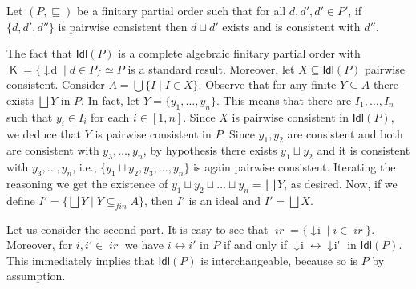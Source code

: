 \documentclass[conference]{IEEEtran}
\renewenvironment{proof}{\begin{IEEEproof}}{\end{IEEEproof}}
\newcommand{\wi}{{interchangeable}}
\newcommand{\compact}[1]{\ensuremath{\mathop{\mathsf{K}({#1})}}}
\newcommand{\principal}[1]{\ensuremath{\mathop{\downarrow\!{#1}}}}
\newcommand{\ideal}[1]{\ensuremath{\mathsf{Idl}({#1})}}
\newcommand{\ir}[1]{\ensuremath{\mathop{\mathit{ir}({#1})}}}
\newcommand{\interval}[2][1]{\ensuremath{[{#1},{#2}]}}
\begin{document}
\begin{proof}
  Let $(P,\sqsubseteq)$ be a 
  finitary partial order such that for all $d, d', d' \in P'$,
  if $\{ d, d', d''\}$ is pairwise consistent then
  $d \sqcup d'$ exists and is consistent with $d''$.

  The fact that $\ideal{P}$ is a
  complete algebraic finitary
  partial order with
  $\compact{\ideal{P}} = \{ \principal{d} \mid d \in P \} \simeq P$ is
  a standard result. 
  Moreover, let $X \subseteq \ideal{P}$ pairwise consistent. Consider
  $A = \bigcup \{ I \mid I \in X\}$. Observe that for any finite
  $Y \subseteq A$ there exists $\bigsqcup Y$ in $P$. In fact, let
  $Y = \{ y_1, \ldots, y_n \}$. This means that there are
  $I_1, \ldots, I_n$ such that $y_i \in I_i$ for each
  $i \in \interval{n}$. Since $X$ is pairwise consistent in
  $\ideal{P}$, we deduce that $Y$ is pairwise consistent in $P$.
  Since $y_1, y_2$ are consistent and both are consistent with
  $y_3, \ldots, y_n$, by {hypothesis} there exists $y_1 \sqcup y_2$ and it is
  consistent with $y_3, \ldots, y_n$, i.e.,
  $\{ y_1 \sqcup y_2, y_3, \ldots, y_n \}$ is again pairwise
  consistent. Iterating the reasoning we get the existence of
  $y_1 \sqcup y_2 \sqcup \ldots \sqcup y_n = \bigsqcup Y$, as desired.
  Now, if we define
  $I' = \{ \bigsqcup Y \mid Y \subseteq_{\mathit{fin}} A \}$, then
  $I'$ is an ideal and $I' = \bigsqcup X$.

  \bigskip

  
  Let us consider the second part. It is easy to see that
  $\ir{\ideal{P}} = \{ \principal{i} \mid i \in \ir{P} \}$.
  Moreover, for $i, i' \in \ir{P}$ we have $i \leftrightarrow i'$
  in $P$ if and only if 
  $\principal{i} \leftrightarrow \principal{i'}$ in $\ideal{P}$.
  This immediately implies that $\ideal{P}$ is {\wi}, because so is
  $P$ by assumption.


\end{proof}
\end{document}
